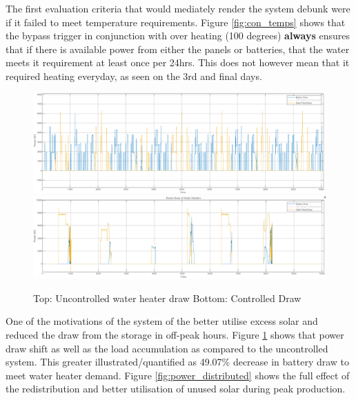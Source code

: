 \documentclass[11pt]{article}
\begin{document}
The first evaluation criteria that would mediately render the system debunk were if it failed to meet temperature requirements. Figure \ref{fig:con_temps} shows that the bypass trigger in conjunction with over heating (100 degrees) \textbf{always} ensures that if there is available power from either the panels or batteries, that the water meets it requirement at least once per 24hrs. This does not however mean that it required heating everyday, as seen on the 3rd and final days.

\begin{figure}[h!]
    \centering
    \includegraphics[width=\textwidth]{inc/uncontrolled_WH_draw.png}
    \includegraphics[width=\textwidth]{inc/controlled_WH_draw.png}
    \caption{Top: Uncontrolled water heater draw      Bottom: Controlled Draw}
    \label{fig:bat_wh}
\end{figure}

\newpage
One of the motivations of the system of the better utilise excess solar and reduced the draw from the storage in off-peak hours. Figure \ref{fig:bat_wh} shows that power draw shift as well as the load accumulation as compared to the uncontrolled system. This greater illustrated/quantified as 49.07\% decrease in battery draw to meet water heater demand. Figure \ref{fig:power_distributed} shows the full effect of the redistribution and better utilisation of unused solar during peak production.
\end{document}
